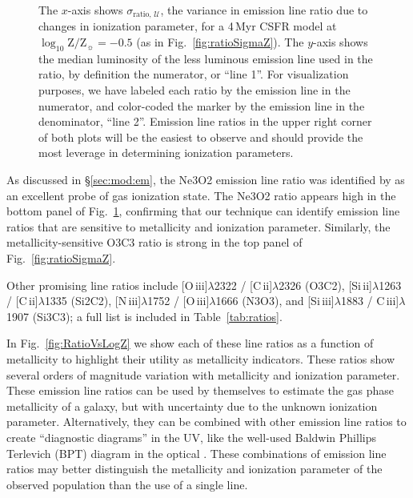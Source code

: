 \documentclass[preprint2]{aastex61}
\newcommand{\niii}{[N\,{\sc iii}]\xspace}
\newcommand{\oiii}{[O\,{\sc iii}]\xspace}
\newcommand{\SiuII}{[Si\,{\sc ii}]\xspace}
\newcommand{\SiuIII}{[Si\,{\sc iii}]\xspace}
\newcommand{\ciii}{C\,{\sc iii}]\xspace}
\newcommand{\cii}{[C\,{\sc ii}]\xspace}
\newcommand{\sigmaRU}{\ensuremath{\sigma_{\mathrm{ratio,}\,\mathcal{U}}}\xspace}
\newcommand{\Myr}{$\,$Myr\xspace}
\newcommand{\logten}{\ensuremath{\log_{10}}}
\newcommand{\logZeq}[1]{\ensuremath{\logten \mathrm{Z}/\mathrm{Z}_{\sun} = #1}}
\begin{document}
\begin{figure}
  \begin{center}
    \caption{The $x$-axis shows \sigmaRU, the variance in emission line ratio due to changes in ionization parameter, for a 4\Myr CSFR model at \logZeq{-0.5} (as in Fig.~\ref{fig:ratioSigmaZ}). The $y$-axis shows the median luminosity of the less luminous emission line used in the ratio, by definition the numerator, or ``line 1''. For visualization purposes, we have labeled each ratio by the emission line in the numerator, and color-coded the marker by the emission line in the denominator, ``line 2''.  Emission line ratios in the upper right corner of both plots will be the easiest to observe and should provide the most leverage in determining ionization parameters.}
    \label{fig:ratioSigmaU}
  \end{center}
\end{figure}


As discussed in \S\ref{sec:mod:em}, the Ne3O2 emission line ratio was identified by \citet{Levesque+2014} as an excellent probe of gas ionization state. The Ne3O2 ratio appears high in the bottom panel of Fig.~\ref{fig:ratioSigmaU}, confirming that our technique can identify emission line ratios that are sensitive to metallicity and ionization parameter. Similarly, the metallicity-sensitive O3C3 ratio \citep[e.g.,][]{Stark+2015, Du+2016, Ding+2016, Gutkin+2016, Feltre+2016} is strong in the top panel of Fig.~\ref{fig:ratioSigmaZ}.

Other promising line ratios include \oiii$\lambda$2322 / \cii$\lambda$2326 (O3C2), \SiuII$\lambda$1263 / \cii$\lambda$1335 (Si2C2), \niii$\lambda$1752 / \oiii$\lambda$1666 (N3O3), and \SiuIII$\lambda$1883 / \ciii$\lambda$1907 (Si3C3); a full list is included in Table~\ref{tab:ratios}. 

In Fig.~\ref{fig:RatioVsLogZ} we show each of these line ratios as a function of metallicity to highlight their utility as metallicity indicators. These ratios show several orders of magnitude variation with metallicity and ionization parameter. These emission line ratios can be used by themselves to estimate the gas phase metallicity of a galaxy, but with uncertainty due to the unknown ionization parameter. Alternatively, they can be combined with other emission line ratios to create ``diagnostic diagrams'' in the UV, like the well-used Baldwin Phillips Terlevich (BPT) diagram in the optical \citep{BPT}. These combinations of emission line ratios may better distinguish the metallicity and ionization parameter of the observed population than the use of a single line.
\end{document}
